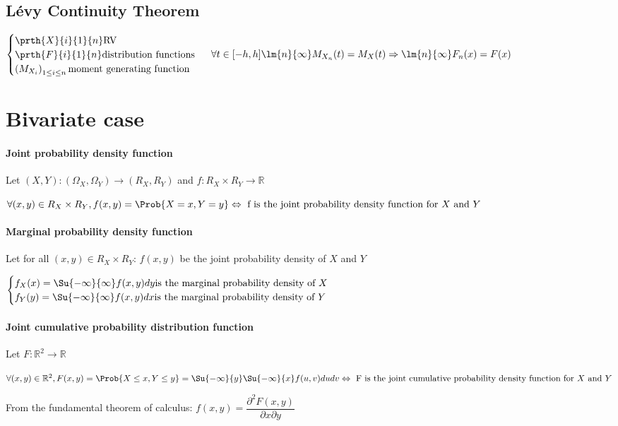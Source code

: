 \subsection{Lévy Continuity Theorem}
\begin{center}
	$
	\begin{cases}	
		\prth{X}{i}{1}{n}\text{RV}\\
		\prth{F}{i}{1}{n}\text{distribution functions}\\
		\left( M_{X_{i}} \right)_{1\leq i\leq n}\text{moment generating function}
	\end{cases}$
	$\forall t\in [-h,h]\lm{n}{\infty}M_{X_{n}}(t)=M_{X}(t)\Rightarrow
	\lm{n}{\infty}F_{n}(x)=F(x)
	$
\end{center}

\section{Bivariate case}
\paragraph{Joint probability density function}
Let $\left(X,Y\right):\left(\Omega_{X},\Omega_{Y}\right)\rightarrow\left(R_{X},R_{Y}\right)$ and $f:R_{X}\times R_{Y}\rightarrow \mathbb{R}$
\begin{center}
	$\forall (x,y)\in R_{X}\times R_{Y},f(x,y)=\Prob{X=x,Y=y}\Leftrightarrow\text{ f is the joint probability density function for }X\text{ and }Y$
\end{center}

\paragraph{Marginal probability density function}
Let for all $(x,y)\in R_{X}\times R_{Y}$: $f(x,y)$ be the joint probability density of $X$ and $Y$
\begin{center}
$\begin{cases}
	f_{X}(x)=\Su{{-\infty}}{\infty}f(x,y)dy\text{is the marginal probability density of }X\\
	f_{Y}(y)=\Su{{-\infty}}{\infty}f(x,y)dx\text{is the marginal probability density of }Y
\end{cases}$
\end{center}
\paragraph{Joint cumulative probability distribution function}
Let $F:\mathbb{R}^{2}\rightarrow\mathbb{R}$
\begin{center}
	$\forall (x,y)\in \mathbb{R}^{2},F(x,y)=\Prob{X\leq x,Y\leq y}=\Su{ {-\infty}}{y}\Su{ {-\infty}}{x}f(u,v)dudv\Leftrightarrow\text{ F is the joint cumulative probability density function for }X\text{ and }Y$
\end{center}
From the fundamental theorem of calculus:
$f(x,y)=\dfrac{\partial^{2}F(x,y)}{\partial x\partial y}$



